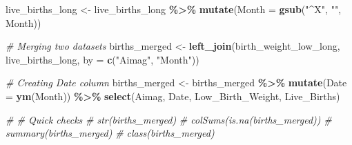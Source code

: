 \documentclass[
]{article}
\newenvironment{Shaded}{\begin{snugshade}}{\end{snugshade}}
\newcommand{\AttributeTok}[1]{\textcolor[rgb]{0.13,0.29,0.53}{#1}}
\newcommand{\CommentTok}[1]{\textcolor[rgb]{0.56,0.35,0.01}{\textit{#1}}}
\newcommand{\FunctionTok}[1]{\textcolor[rgb]{0.13,0.29,0.53}{\textbf{#1}}}
\newcommand{\NormalTok}[1]{#1}
\newcommand{\OtherTok}[1]{\textcolor[rgb]{0.56,0.35,0.01}{#1}}
\newcommand{\SpecialCharTok}[1]{\textcolor[rgb]{0.81,0.36,0.00}{\textbf{#1}}}
\newcommand{\StringTok}[1]{\textcolor[rgb]{0.31,0.60,0.02}{#1}}
\begin{document}
\begin{Shaded}
\begin{Highlighting}[]
\NormalTok{live\_births\_long }\OtherTok{\textless{}{-}}\NormalTok{ live\_births\_long }\SpecialCharTok{\%\textgreater{}\%}
  \FunctionTok{mutate}\NormalTok{(}\AttributeTok{Month =} \FunctionTok{gsub}\NormalTok{(}\StringTok{"\^{}X"}\NormalTok{, }\StringTok{""}\NormalTok{, Month))}

\CommentTok{\# Merging two datasets}
\NormalTok{births\_merged }\OtherTok{\textless{}{-}} \FunctionTok{left\_join}\NormalTok{(birth\_weight\_low\_long, live\_births\_long, }\AttributeTok{by =} \FunctionTok{c}\NormalTok{(}\StringTok{"Aimag"}\NormalTok{, }\StringTok{"Month"}\NormalTok{))}

\CommentTok{\# Creating Date column}
\NormalTok{births\_merged }\OtherTok{\textless{}{-}}\NormalTok{ births\_merged }\SpecialCharTok{\%\textgreater{}\%}
  \FunctionTok{mutate}\NormalTok{(}\AttributeTok{Date =} \FunctionTok{ym}\NormalTok{(Month)) }\SpecialCharTok{\%\textgreater{}\%}
  \FunctionTok{select}\NormalTok{(Aimag, Date, Low\_Birth\_Weight, Live\_Births)}

\CommentTok{\# \# Quick checks}
\CommentTok{\# str(births\_merged)}
\CommentTok{\# colSums(is.na(births\_merged))}
\CommentTok{\# summary(births\_merged)}
\CommentTok{\# class(births\_merged)}
\end{Highlighting}
\end{Shaded}
\end{document}
